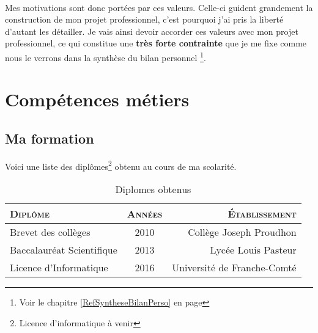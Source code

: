\documentclass[a4paper,12pt, draft]{report}
\newcommand{\tabTitle}[1]{\hfill{} \textsc{#1} \hfill{} }
\begin{document}

\paragraph{}
Mes motivations sont donc portées par ces valeurs. Celle-ci guident grandement la construction de mon projet professionnel, c'est pourquoi j'ai pris la liberté d'autant les détailler.
Je vais ainsi devoir accorder ces valeurs avec mon projet professionnel, ce qui constitue une \textbf{très forte contrainte} que je me fixe comme nous le verrons dans la synthèse du bilan personnel \footnote{Voir le chapitre \ref{RefSyntheseBilanPerso} en page \pageref{RefSyntheseBilanPerso}}.

\newpage

\section{Compétences métiers}
\subsection{Ma formation}
Voici une liste des diplômes\footnote{Licence d'informatique à venir} obtenu au cours de ma scolarité.
\begin{table}[h]
\begin{center}
\begin{tabular}{|l|c|r|}
\hline
\tabTitle{Diplôme} & \tabTitle{Années} & \tabTitle{Établissement}\\
\hline
Brevet des collèges & 2010 & Collège Joseph Proudhon \\
\hline
Baccalauréat Scientifique & 2013 & Lycée Louis Pasteur \\
\hline
Licence d'Informatique & 2016 & Université de Franche-Comté\\
\hline
\end{tabular}
\end{center}
\caption{Diplomes obtenus} 
\end{table}
\end{document}
